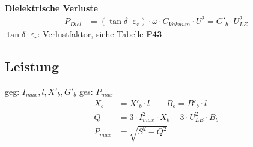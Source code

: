 \textbf{Dielektrische Verluste}
\begin{align*}
    P_{Diel} &= (\tan \delta \cdot \varepsilon_{r}) \cdot \omega \cdot C_{\mathit{Vakuum}} \cdot U^2 = G'_b\cdot U^2_{LE}
\end{align*}
\indent $\tan \delta \cdot \varepsilon_{r}$: Verlustfaktor, siehe Tabelle \textbf{F43}


\subsection{Leistung}
geg: $I_{max} , l , X'_b, G'_b$ \qquad ges: $P_{max}$
\begin{align*}
    X_b &= X'_b \cdot l \qquad B_b = B'_b \cdot l \\
    Q &= 3 \cdot I^2_{max} \cdot X_b - 3 \cdot U^2_{LE} \cdot B_b\\
    P_{max} &= \sqrt{S^2-Q^2}
\end{align*}

